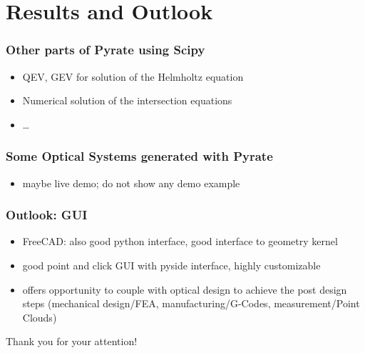 \documentclass[
10pt,
]{beamer}
\newcommand{\remark}[1]{{\color{red}{#1}}}
\begin{document}
\section{Results and Outlook}

\begin{frame}
 \frametitle{Other parts of Pyrate using Scipy}
  \begin{itemize}
   \item QEV, GEV for solution of the Helmholtz equation
   \item Numerical solution of the intersection equations
   \item \dots
  \end{itemize}

\end{frame}


\begin{frame}
 \frametitle{Some Optical Systems generated with Pyrate}
 \begin{itemize}
  \item maybe live demo; do not show any demo example
 \end{itemize}

\end{frame}

\begin{frame}
 \frametitle{Outlook: GUI}
 \begin{itemize}
  \item FreeCAD: also good python interface, good interface to geometry kernel
  \item good point and click GUI with pyside interface, highly customizable
  \item offers opportunity to couple with optical design to achieve the post design steps
    (mechanical design/FEA, manufacturing/G-Codes, measurement/Point Clouds)
 \end{itemize}

\end{frame}

\begin{frame}
 \begin{center}
  Thank you for your attention!\remark{nice picture}
 \end{center}
\end{frame}
\end{document}
